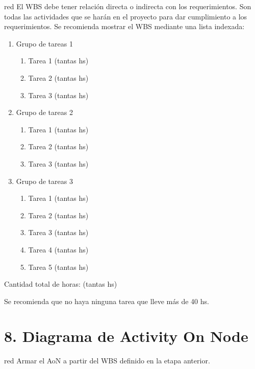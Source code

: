\documentclass[
11pt, %
codirector, %
]{charter}
\begin{document}
\begin{consigna}{red}
El WBS debe tener relación directa o indirecta con los requerimientos.  Son todas las actividades que se harán en el proyecto para dar cumplimiento a los requerimientos. Se recomienda mostrar el WBS mediante una lista indexada:

\begin{enumerate}
\item Grupo de tareas 1
	\begin{enumerate}
	\item Tarea 1 (tantas hs)
	\item Tarea 2 (tantas hs)
	\item Tarea 3 (tantas hs)
	\end{enumerate}
\item Grupo de tareas 2
	\begin{enumerate}
	\item Tarea 1 (tantas hs)
	\item Tarea 2 (tantas hs)
	\item Tarea 3 (tantas hs)
	\end{enumerate}
\item Grupo de tareas 3
	\begin{enumerate}
	\item Tarea 1 (tantas hs)
	\item Tarea 2 (tantas hs)
	\item Tarea 3 (tantas hs)
	\item Tarea 4 (tantas hs)
	\item Tarea 5 (tantas hs)
	\end{enumerate}
\end{enumerate}

Cantidad total de horas: (tantas hs)

Se recomienda que no haya ninguna tarea que lleve más de 40 hs. 

\end{consigna}

\section{8. Diagrama de Activity On Node}
\label{sec:AoN}

\begin{consigna}{red}
Armar el AoN a partir del WBS definido en la etapa anterior. 



\end{consigna}
\end{document}
